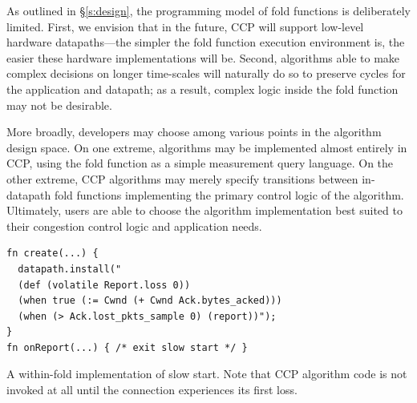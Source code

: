  As outlined in \S\ref{s:design}, the programming model of fold functions is deliberately limited.
First, we envision that in the future, CCP will support low-level hardware datapaths---the simpler the fold function execution environment is, the easier these hardware implementations will be. Second, algorithms able to make complex decisions on longer time-scales will naturally do so to preserve cycles for the application and datapath; as a result, complex logic inside the fold function may not be desirable.

More broadly, developers may choose among various points in the algorithm design space. 
On one extreme, algorithms may be implemented almost entirely in CCP, using the fold function as a simple measurement query language.
On the other extreme, CCP algorithms may merely specify transitions between in-datapath fold functions implementing the primary control logic of the algorithm.
Ultimately, users are able to choose the algorithm implementation best suited to their congestion control logic and application needs.

\begin{listing}[t]
{\footnotesize
\begin{verbatim}
fn create(...) {
  datapath.install("
  (def (volatile Report.loss 0))
  (when true (:= Cwnd (+ Cwnd Ack.bytes_acked)))
  (when (> Ack.lost_pkts_sample 0) (report))");
}
fn onReport(...) { /* exit slow start */ }
\end{verbatim}
}
\caption{A within-fold implementation of slow start. Note that CCP algorithm code is not invoked at all until the connection experiences its first loss.} \label{lst:ccp:ssfold}
\end{listing}
